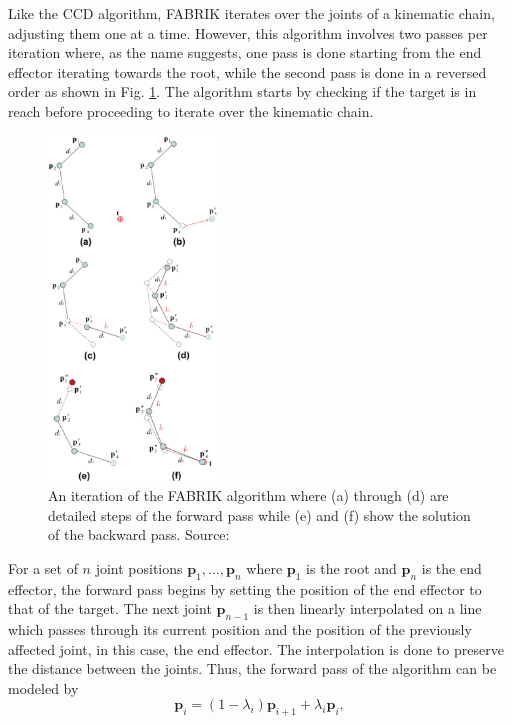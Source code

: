 Like the CCD algorithm, FABRIK iterates over the joints of a kinematic chain,
adjusting them one at a time. However, this algorithm involves two passes per
iteration where, as the name suggests, one pass is done starting from the end
effector iterating towards the root, while the second pass is done in a reversed
order as shown in Fig. \ref{fig:fabrik}. The algorithm starts by checking if the
target is in reach before proceeding to iterate over the kinematic chain. 

\begin{figure}[!h]
    \centering
    \captionsetup{justification=centering}
    \includegraphics[width=0.4\textwidth]{grafika/fabrik_iteration.eps}
    \caption{An iteration of the FABRIK algorithm where (a) through (d) are
    detailed steps of the forward pass while (e) and (f) show the solution of
    the backward pass. Source: \cite{Aristidou2011}}
    \label{fig:fabrik}
\end{figure}

For a set of \(n\) joint positions \(\mathbf{p}_1, \dots, \mathbf{p}_n\) where
\(\mathbf{p}_1\) is the root and \(\mathbf{p}_n\) is the end effector, the forward pass
begins by setting the position of the end effector to that of the target. The
next joint \(\mathbf{p}_{n-1}\) is then linearly interpolated on a line which
passes through its current position and the position of the previously affected
joint, in this case, the end effector. The interpolation is done to preserve the
distance between the joints. Thus, the forward pass of the algorithm can be
modeled by 
\begin{equation}
    \mathbf{p}_i = (1 - \lambda_i)\mathbf{p}_{i+1} + \lambda_i \mathbf{p}_i,
\end{equation}

